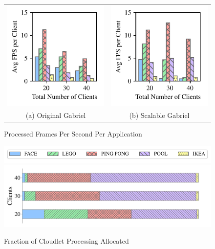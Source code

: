 \begin{figure}[]
	\begin{center}
		\begin{tabular}{c@{}c}
			\includegraphics[width=.5\linewidth]{FIGS/fig-eval-fps-baseline.pdf}
			            & \includegraphics[width=.5\linewidth]{FIGS/fig-eval-fps-cpushares.pdf} \\
			{(a) Original Gabriel} & {(b) Scalable Gabriel}                                                
		\end{tabular}
	\end{center}
	\caption{Processed Frames Per Second Per Application}
	\label{fig:frame-fps}
\end{figure}

\begin{figure}[]
	\begin{center}
		\includegraphics[width=.7\linewidth]{FIGS/fig-alloc-latency-legend.pdf}
		\includegraphics[width=.7\linewidth]{FIGS/fig-sec6-latency-allocation.pdf}
	\end{center}
\vspace{-0.1in}
	\caption{Fraction of Cloudlet Processing Allocated}
  \label{figs:resource-allocated}
\end{figure}


